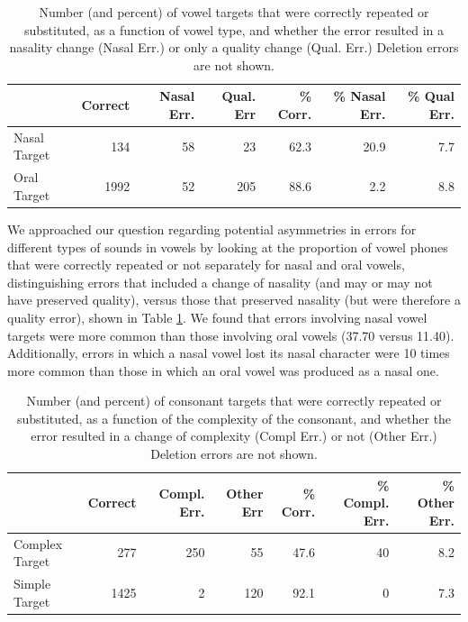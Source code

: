 \documentclass[english,,man,floatsintext]{apa6}
\begin{document}
\begin{table}

\caption{\label{tab:tab-v}Number (and percent) of vowel targets that were correctly repeated or substituted, as a function of vowel type, and whether the error resulted in a nasality change (Nasal Err.) or only a quality change (Qual. Err.) Deletion errors are not shown.}
\centering
\begin{tabular}[t]{lrrrrrr}
\toprule
  & Correct & Nasal Err. & Qual. Err & \% Corr. & \% Nasal Err. & \% Qual Err.\\
\midrule
Nasal Target & 134 & 58 & 23 & 62.3 & 20.9 & 7.7\\
Oral Target & 1992 & 52 & 205 & 88.6 & 2.2 & 8.8\\
\bottomrule
\end{tabular}
\end{table}

We approached our question regarding potential asymmetries in errors for different types of sounds in vowels by looking at the proportion of vowel phones that were correctly repeated or not separately for nasal and oral vowels, distinguishing errors that included a change of nasality (and may or may not have preserved quality), versus those that preserved nasality (but were therefore a quality error), shown in Table \ref{tab:tab-v}. We found that errors involving nasal vowel targets were more common than those involving oral vowels (37.70 versus 11.40). Additionally, errors in which a nasal vowel lost its nasal character were 10 times more common than those in which an oral vowel was produced as a nasal one.

\begin{table}

\caption{\label{tab:tab-c}Number (and percent) of consonant targets that were correctly repeated or substituted, as a function of the complexity of the consonant, and whether the error resulted in a change of complexity (Compl Err.) or not (Other Err.) Deletion errors are not shown.}
\centering
\begin{tabular}[t]{lrrrrrr}
\toprule
  & Correct & Compl. Err. & Other Err & \% Corr. & \% Compl. Err. & \% Other Err.\\
\midrule
Complex Target & 277 & 250 & 55 & 47.6 & 40 & 8.2\\
Simple Target & 1425 & 2 & 120 & 92.1 & 0 & 7.3\\
\bottomrule
\end{tabular}
\end{table}
\end{document}
